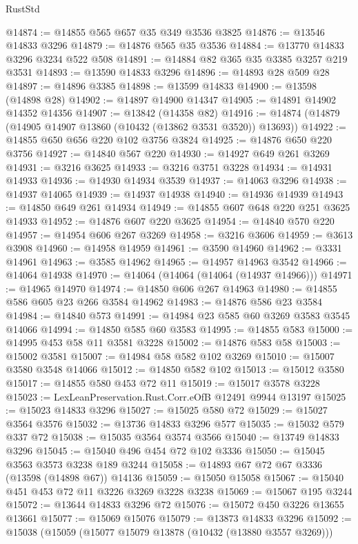 \begin{lexlean}{RustStd}
\begin{coremodule}
@14874 := @14855 @565 @657 @35 @349 @3536 @3825
@14876 := @13546 @14833 @3296
@14879 := @14876 @565 @35 @3536
@14884 := @13770 @14833 @3296 @3234 @522 @508
@14891 := @14884 @82 @365 @35 @3385 @3257 @219 @3531
@14893 := @13590 @14833 @3296
@14896 := @14893 @28 @509 @28
@14897 := @14896 @3385
@14898 := @13599 @14833
@14900 := @13598 (@14898 @28)
@14902 := @14897 @14900 @14347
@14905 := @14891 @14902 @14352 @14356
@14907 := @13842 (@14358 @82)
@14916 := @14874 (@14879 (@14905 @14907 @13860 (@10432 (@13862 @3531 @3520)) @13693))
@14922 := @14855 @650 @656 @220 @102 @3756 @3824
@14925 := @14876 @650 @220 @3756
@14927 := @14840 @567 @220
@14930 := @14927 @649 @261 @3269
@14931 := @3216 @3625
@14933 := @3216 @3751 @3228
@14934 := @14931 @14933
@14936 := @14930 @14934 @3539
@14937 := @14063 @3296
@14938 := @14937 @14065
@14939 := @14937 @14938
@14940 := @14936 @14939
@14943 := @14850 @649 @261 @14934
@14949 := @14855 @607 @648 @220 @251 @3625 @14933
@14952 := @14876 @607 @220 @3625
@14954 := @14840 @570 @220
@14957 := @14954 @606 @267 @3269
@14958 := @3216 @3606
@14959 := @3613 @3908
@14960 := @14958 @14959
@14961 := @3590 @14960
@14962 := @3331 @14961
@14963 := @3585 @14962
@14965 := @14957 @14963 @3542
@14966 := @14064 @14938
@14970 := @14064 (@14064 (@14064 (@14937 @14966)))
@14971 := @14965 @14970
@14974 := @14850 @606 @267 @14963
@14980 := @14855 @586 @605 @23 @266 @3584 @14962
@14983 := @14876 @586 @23 @3584
@14984 := @14840 @573
@14991 := @14984 @23 @585 @60 @3269 @3583 @3545 @14066
@14994 := @14850 @585 @60 @3583
@14995 := @14855 @583
@15000 := @14995 @453 @58 @11 @3581 @3228
@15002 := @14876 @583 @58
@15003 := @15002 @3581
@15007 := @14984 @58 @582 @102 @3269
@15010 := @15007 @3580 @3548 @14066
@15012 := @14850 @582 @102
@15013 := @15012 @3580
@15017 := @14855 @580 @453 @72 @11
@15019 := @15017 @3578 @3228
@15023 := LexLeanPreservation.Rust.Corr.eOfB @12491 @9944 @13197
@15025 := @15023 @14833 @3296
@15027 := @15025 @580 @72
@15029 := @15027 @3564 @3576
@15032 := @13736 @14833 @3296 @577
@15035 := @15032 @579 @337 @72
@15038 := @15035 @3564 @3574 @3566
@15040 := @13749 @14833 @3296
@15045 := @15040 @496 @454 @72 @102 @3336
@15050 := @15045 @3563 @3573 @3238 @189 @3244
@15058 := @14893 @67 @72 @67 @3336 (@13598 (@14898 @67)) @14136
@15059 := @15050 @15058
@15067 := @15040 @451 @453 @72 @11 @3226 @3269 @3228 @3238
@15069 := @15067 @195 @3244
@15072 := @13644 @14833 @3296 @72
@15076 := @15072 @450 @3226 @13655 @13661
@15077 := @15069 @15076
@15079 := @13873 @14833 @3296
@15092 := @15038
    (@15059
      (@15077 @15079 @13878 (@10432 (@13880 @3557 @3269)))

\end{coremodule}
\end{lexlean}
